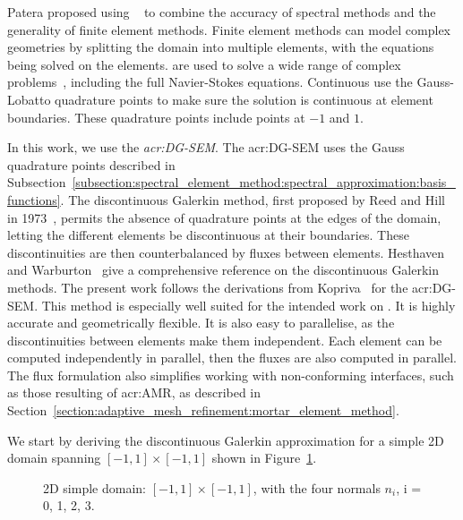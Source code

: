 Patera proposed using ~\cite{Patera1984} to combine the accuracy of spectral
methods and the generality of finite element methods. Finite element methods can model complex
geometries by splitting the domain into multiple elements, with the equations being solved on the
elements.  are used to solve a wide range of complex problems~\cite{Deville2003},
including the full Navier-Stokes equations. Continuous  use the Gauss-Lobatto
quadrature points to make sure the solution is continuous at element boundaries. These quadrature
points include points at \(-1\) and \(1\).

In this work, we use the \textit{\acrfull{acr:DG-SEM}}. The \acrshort{acr:DG-SEM} uses the Gauss
quadrature points described in
Subsection~\ref{subsection:spectral_element_method:spectral_approximation:basis_functions}. The
discontinuous Galerkin method, first proposed by Reed and Hill in 1973~\cite{Reed1973}, permits the
absence of quadrature points at the edges of the domain, letting the different elements be
discontinuous at their boundaries. These discontinuities are then counterbalanced by fluxes between
elements. Hesthaven and Warburton~\cite{Hesthaven2007} give a comprehensive reference on the
discontinuous Galerkin methods. The present work follows the derivations from
Kopriva~\cite{Kopriva2009} for the \acrshort{acr:DG-SEM}. This method is especially well suited for
the intended work on . It is highly accurate and geometrically flexible. It is
also easy to parallelise, as the discontinuities between elements make them independent. Each
element can be computed independently in parallel, then the fluxes are also computed in parallel.
The flux formulation also simplifies working with non-conforming interfaces, such as those resulting
of \acrlong{acr:AMR}, as described in
Section~\ref{section:adaptive_mesh_refinement:mortar_element_method}.

We start by deriving the discontinuous Galerkin approximation for a simple 2D domain spanning
\(\left[ -1, 1 \right] \times \left[ -1, 1 \right]\) shown in Figure~\ref{fig:simple_domain}.

\begin{figure}[H]
	\centering
	
	\caption{2D simple domain: \(\left[ -1, 1 \right] \times \left[ -1, 1 \right]\), with the four normals \(n_i\), i = 0, 1, 2, 3.}\label{fig:simple_domain}
\end{figure}

